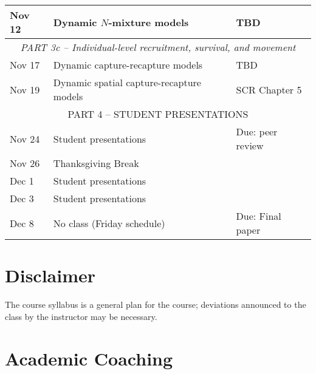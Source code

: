 \documentclass[12pt]{article}
\begin{document}
\begin{center}
\begin{tabular}[c]{lll}
Nov 12     & Dynamic $N$-mixture models                   & TBD                              \\
\hline
           \multicolumn{3}{c}{\it PART 3c -- Individual-level recruitment, survival, and movement} \\
\hline
Nov 17     & Dynamic capture-recapture models             & TBD                              \\
Nov 19     & Dynamic spatial capture-recapture models     & SCR Chapter 5                    \\
\hline
           \multicolumn{3}{c}{PART 4 -- STUDENT PRESENTATIONS}                                    \\
\hline
Nov 24     & Student presentations                        & Due: peer review                 \\
Nov 26     & Thanksgiving Break                           &                                  \\
\hline
Dec 1      & Student presentations                        &                                  \\
Dec 3      & Student presentations                        &                                  \\
\hline
Dec 8      & No class (Friday schedule)                   & Due: Final paper                 \\
\hline \hline
\end{tabular}
\end{center}


\clearpage


\vspace{-2mm}
\section*{\normalsize Disclaimer}
\vspace{-4mm}

The course syllabus is a general plan for the course; deviations
announced to the class by the instructor may be necessary. 


\vspace{-2mm}
\section*{\normalsize Academic Coaching}
\vspace{-4mm}
\end{document}
